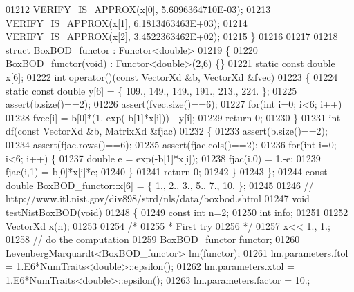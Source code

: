 \begin{DoxyCode}
01212   VERIFY\_IS\_APPROX(x[0], 5.6096364710E-03);
01213   VERIFY\_IS\_APPROX(x[1], 6.1813463463E+03);
01214   VERIFY\_IS\_APPROX(x[2], 3.4522363462E+02);
01215 \}
01216 
01217 
01218 \textcolor{keyword}{struct }\hyperlink{struct_box_b_o_d__functor}{BoxBOD\_functor} : \hyperlink{struct_functor}{Functor}<double>
01219 \{
01220     \hyperlink{struct_box_b_o_d__functor}{BoxBOD\_functor}(\textcolor{keywordtype}{void}) : \hyperlink{struct_functor}{Functor}<double>(2,6) \{\}
01221     \textcolor{keyword}{static} \textcolor{keyword}{const} \textcolor{keywordtype}{double} x[6];
01222     \textcolor{keywordtype}{int} operator()(\textcolor{keyword}{const} VectorXd &b, VectorXd &fvec)
01223     \{
01224         \textcolor{keyword}{static} \textcolor{keyword}{const} \textcolor{keywordtype}{double} y[6] = \{ 109., 149., 149., 191., 213., 224. \};
01225         assert(b.size()==2);
01226         assert(fvec.size()==6);
01227         \textcolor{keywordflow}{for}(\textcolor{keywordtype}{int} i=0; i<6; i++)
01228             fvec[i] =  b[0]*(1.-exp(-b[1]*x[i])) - y[i];
01229         \textcolor{keywordflow}{return} 0;
01230     \}
01231     \textcolor{keywordtype}{int} df(\textcolor{keyword}{const} VectorXd &b, MatrixXd &fjac)
01232     \{
01233         assert(b.size()==2);
01234         assert(fjac.rows()==6);
01235         assert(fjac.cols()==2);
01236         \textcolor{keywordflow}{for}(\textcolor{keywordtype}{int} i=0; i<6; i++) \{
01237             \textcolor{keywordtype}{double} e = exp(-b[1]*x[i]);
01238             fjac(i,0) = 1.-e;
01239             fjac(i,1) = b[0]*x[i]*e;
01240         \}
01241         \textcolor{keywordflow}{return} 0;
01242     \}
01243 \};
01244 \textcolor{keyword}{const} \textcolor{keywordtype}{double} BoxBOD\_functor::x[6] = \{ 1., 2., 3., 5., 7., 10. \};
01245 
01246 \textcolor{comment}{// http://www.itl.nist.gov/div898/strd/nls/data/boxbod.shtml}
01247 \textcolor{keywordtype}{void} testNistBoxBOD(\textcolor{keywordtype}{void})
01248 \{
01249   \textcolor{keyword}{const} \textcolor{keywordtype}{int} n=2;
01250   \textcolor{keywordtype}{int} info;
01251 
01252   VectorXd x(n);
01253 
01254   \textcolor{comment}{/*}
01255 \textcolor{comment}{   * First try}
01256 \textcolor{comment}{   */}
01257   x<< 1., 1.;
01258   \textcolor{comment}{// do the computation}
01259   \hyperlink{struct_box_b_o_d__functor}{BoxBOD\_functor} functor;
01260   LevenbergMarquardt<BoxBOD\_functor> lm(functor);
01261   lm.parameters.ftol = 1.E6*NumTraits<double>::epsilon();
01262   lm.parameters.xtol = 1.E6*NumTraits<double>::epsilon();
01263   lm.parameters.factor = 10.;

\end{DoxyCode}
